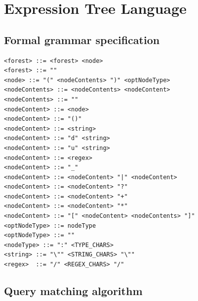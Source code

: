 \chapter{Expression Tree Language}

\section{Formal grammar specification}

\begin{lstlisting}[caption={BNF formal ETL grammar specification.},
                   label={lst:etl-grammar}]
<forest> ::= <forest> <node> 
<forest> ::= ""
<node> ::= "(" <nodeContents> ")" <optNodeType>
<nodeContents> ::= <nodeContents> <nodeContent>
<nodeContents> ::= ""
<nodeContent> ::= <node>
<nodeContent> ::= "()"
<nodeContent> ::= <string>
<nodeContent> ::= "d" <string>
<nodeContent> ::= "u" <string>
<nodeContent> ::= <regex>
<nodeContent> ::= "_"
<nodeContent> ::= <nodeContent> "|" <nodeContent>
<nodeContent> ::= <nodeContent> "?"
<nodeContent> ::= <nodeContent> "+"
<nodeContent> ::= <nodeContent> "*"
<nodeContent> ::= "[" <nodeContent> <nodeContents> "]"
<optNodeType> ::= nodeType
<optNodeType> ::= ""
<nodeType> ::= ":" <TYPE_CHARS>
<string> ::= "\"" <STRING_CHARS> "\""
<regex>  ::= "/" <REGEX_CHARS> "/"
\end{lstlisting}

\section{Query matching algorithm}

